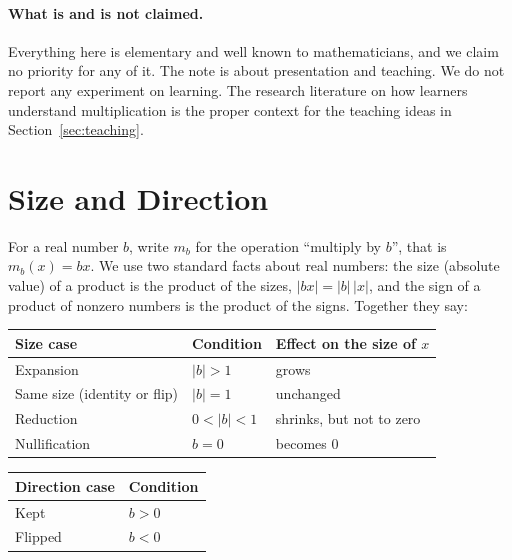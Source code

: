 \documentclass[12pt]{article}
\theoremstyle{definition}
\theoremstyle{remark}
\begin{document}
\paragraph{What is and is not claimed.}
Everything here is elementary and well known to mathematicians, and we claim no priority for any of it. The note is about presentation and teaching. We do not report any experiment on learning. The research literature on how learners understand multiplication \cite{fischbein1985,vergnaud1983,greer1992,thompson2003} is the proper context for the teaching ideas in Section~\ref{sec:teaching}.

\section{Size and Direction}
For a real number $b$, write $m_b$ for the operation ``multiply by $b$'', that is $m_b(x)=bx$. We use two standard facts about real numbers: the size (absolute value) of a product is the product of the sizes, $|bx|=|b|\,|x|$, and the sign of a product of nonzero numbers is the product of the signs. Together they say:

\begin{center}
\end{center}

\begin{center}
\begin{tabular}{@{}lll@{}}
\toprule
Size case & Condition & Effect on the size of $x$\\\midrule
Expansion & $|b|>1$ & grows\\
Same size (identity or flip) & $|b|=1$ & unchanged\\
Reduction & $0<|b|<1$ & shrinks, but not to zero\\
Nullification & $b=0$ & becomes $0$\\\bottomrule
\end{tabular}
\qquad
\begin{tabular}{@{}ll@{}}
\toprule
Direction case & Condition\\\midrule
Kept & $b>0$\\
Flipped & $b<0$\\\bottomrule
\end{tabular}
\end{center}
\end{document}
